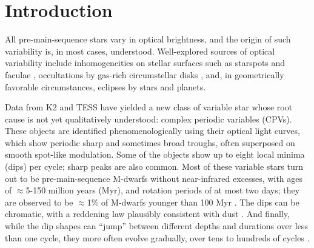 \documentclass[11pt,twocolumn,tighten]{aastex63}
\begin{document}

\section{Introduction}
\label{sec:intro}

All pre-main-sequence stars vary in optical brightness, and the origin
of such variability is, in most cases, understood.  Well-explored
sources of optical variability include inhomogeneities on stellar
surfaces such as starspots and faculae
\citep[e.g.][]{2021isma.book.....B}, occultations by gas-rich
circumstellar disks \citep[e.g.][]{2017MNRAS.470..202B}, and, in
geometrically favorable circumstances, eclipses by stars and planets.

Data from K2 and TESS have yielded a new class of variable star whose
root cause is not yet qualitatively understood: complex periodic
variables (CPVs).  These objects are identified phenomenologically
using their optical light curves, which show periodic sharp and
sometimes broad troughs, often superposed on smooth spot-like
modulation.  Some of the objects show up to eight local minima (dips)
per cycle; sharp peaks are also common.  Most of these variable stars
turn out to be pre-main-sequence M-dwarfs without near-infrared
excesses, with ages of $\approx$5-150 million years (Myr), and
rotation periods of at most two days; they are observed to be
$\approx$1\% of M-dwarfs younger than 100 Myr
\citep{2017AJ....153..152S,2018AJ....155...63S,2019ApJ...876..127Z,2022AJ....163..144G}.
The dips can be chromatic, with a reddening law plausibly consistent
with dust
\citep{2020AJ....160...86B,2022AJ....163..144G,2023MNRAS.518.2921K}.
And finally, while the dip shapes can ``jump'' between different
depths and durations over less than one cycle, they more often evolve
gradually, over tens to hundreds of cycles
\citep[e.g.][]{2017AJ....153..152S,2020AJ....160...86B,2023ApJ...945..114P}.
\end{document}
